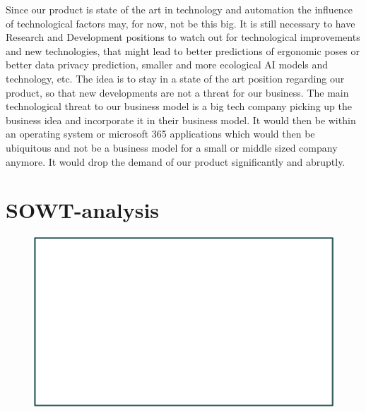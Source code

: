 Since our product is state of the art in technology and automation the influence of technological factors may, for now, not be this big. It is still necessary to have Research and Development positions to watch out for technological improvements and new technologies, that might lead to better predictions of ergonomic poses or better data privacy prediction, smaller and more ecological AI models and technology, etc. The idea is to stay in a state of the art position regarding our product, so that new developments are not a threat for our business.
The main technological threat to our business model is a big tech company picking up the business idea and incorporate it in their business model. It would then be within an operating system or microsoft 365 applications which would then be ubiquitous and not be a business model for a small or middle sized company anymore. It would drop the demand of our product significantly and abruptly. 

\section{SOWT-analysis}

\begin{figure}[h]
    \includegraphics[width=17.5cm]{SWOT_analysis.png}
\end{figure}

